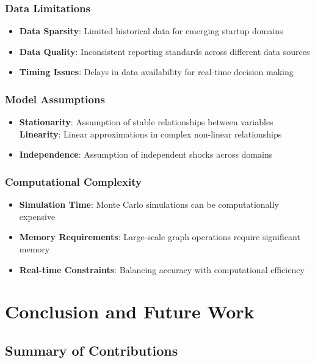 \documentclass[conference]{IEEEtran}
\begin{document}
\subsubsection{Data Limitations}
\begin{itemize}
    \item \textbf{Data Sparsity}: Limited historical data for emerging startup domains
    \item \textbf{Data Quality}: Inconsistent reporting standards across different data sources
    \item \textbf{Timing Issues}: Delays in data availability for real-time decision making
\end{itemize}

\subsubsection{Model Assumptions}
\begin{itemize}
    \item \textbf{Stationarity}: Assumption of stable relationships between variables
    \textbf{Linearity}: Linear approximations in complex non-linear relationships
    \item \textbf{Independence}: Assumption of independent shocks across domains
\end{itemize}

\subsubsection{Computational Complexity}
\begin{itemize}
    \item \textbf{Simulation Time}: Monte Carlo simulations can be computationally expensive
    \item \textbf{Memory Requirements}: Large-scale graph operations require significant memory
    \item \textbf{Real-time Constraints}: Balancing accuracy with computational efficiency
\end{itemize}

\section{Conclusion and Future Work}

\subsection{Summary of Contributions}
\end{document}
